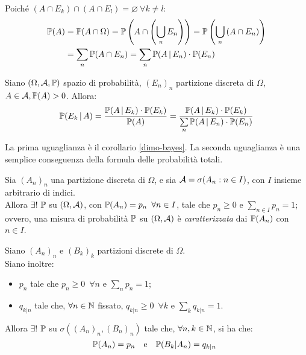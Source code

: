 \begin{dimo}\belowdisplayskip=-20pt
  Poiché $(A \cap E_k) \cap (A \cap E_l) = \varnothing \ \forall k \neq l$:
  \begin{align*}
  \mathbb P(A) &= \mathbb P(A \cap \Omega)
  = \mathbb P \left(A \cap \left(\bigcup\limits_n E_n\right) \right)
  = \mathbb P \left(\bigcup\limits_n \left(A \cap E_n\right) \right)\\
  &= \sum\limits_n \mathbb P (A \cap E_n)
  = \sum\limits_n \mathbb P (A \,|\, E_n) \cdot \mathbb P (E_n)
  \end{align*}\qedhere
\end{dimo}

\medskip
\begin{teo}
  Siano $(\Omega, \mathcal A, \mathbb P)$ spazio di probabilità,
  $(E_n)_n$ partizione discreta di $\Omega$,
  $A \in \mathcal A, \mathbb P(A) > 0$. Allora:
  $$
  \mathbb P(E_k \,|\, A)
  = \frac {\mathbb P(A \,|\, E_k) \cdot \mathbb P(E_k)} {\mathbb P(A)}
  = \frac
    {\mathbb P(A \,|\, E_k) \cdot \mathbb P(E_k)}
    {\sum\limits_n \mathbb P(A \,|\, E_n) \cdot \mathbb P(E_n)}
  $$
\end{teo}

La prima uguaglianza è il corollario \ref{dimo-bayes}.
La seconda uguaglianza è una semplice conseguenza della formula delle probabilità
totali.

\begin{teo}
	Sia $(A_n)_n$ una partizione discreta di $\Omega$, e sia $\mathcal A = \sigma(A_n : n \in I)$, con $I$ insieme arbitrario di indici. \\
	Allora $\exists! \ \mathbb P $ su $(\Omega,\mathcal A)$, con $ \mathbb P(A_n) = p_n \enspace \forall n \in I$, tale che $p_n \ge 0$ e $\sum_{n\in I}p_n = 1$;
	ovvero, una misura di probabilità $\mathbb P$ su $(\Omega,\mathcal A)$ è \emph{caratterizzata} dai $\mathbb P(A_n)$ con $n \in I$.
\end{teo}

\begin{teo}
	Siano $(A_n)_n$ e $(B_k)_k$ partizioni discrete di $\Omega$. \\
	Siano inoltre: 
	\begin{itemize}
		\item $p_n$ tale che $p_n \ge 0 \enspace \forall n$ e $\sum_{n}p_n = 1$;
		\item $q_{k|n}$ tale che, $\forall n \in \mathbb N$ fissato, $q_{k|n} \ge 0 \enspace \forall k$ e $\sum_{k}q_{k|n} = 1$.
	\end{itemize}
	Allora $\exists!$ $ \mathbb P$ su $\sigma((A_n)_n,(B_n)_n)$ tale che, $\forall n,k \in \mathbb N$, si ha che:
	$$\mathbb P(A_n) = p_n \quad \text e \quad \mathbb P(B_k | A_n) = q_{k|n} \enspace $$
\end{teo}

